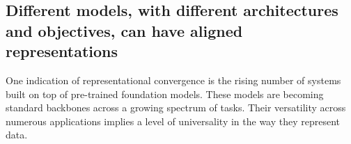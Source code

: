 \documentclass{article}
\newcommand{\bc}[1]{{\color{olive}BC: #1}}
\theoremstyle{plain}
\theoremstyle{definition}
\theoremstyle{remark}
\begin{document}

\subsection{Different models, with different architectures and objectives, can have aligned representations}


One indication of representational convergence is the rising number of systems built on top of pre-trained foundation models. These models are becoming standard backbones across a growing spectrum of tasks. Their versatility across numerous applications implies a level of universality in the way they represent data. %
\end{document}
